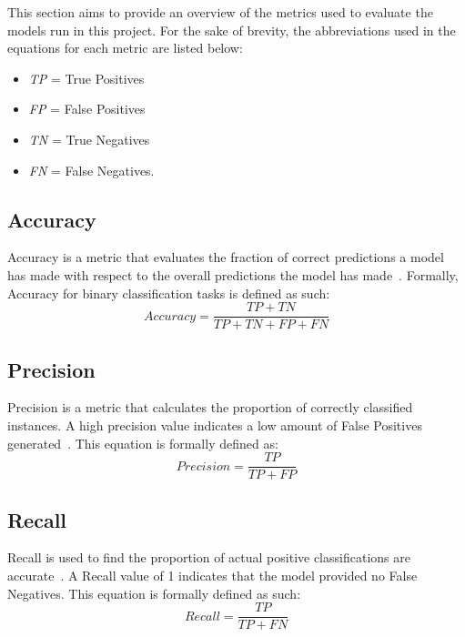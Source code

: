 \documentclass[11pt, a4paper]{article}
\begin{document}
This section aims to provide an overview of the metrics used to evaluate the models run in this project. For the sake of brevity, the abbreviations used in the equations for each metric are listed below:
\begin{itemize}
\item \emph{TP} = True Positives 
\item \emph{FP} = False Positives 
\item \emph{TN} = True Negatives 
\item \emph{FN} = False Negatives.
\end{itemize}

\subsection{Accuracy}

Accuracy is a metric that evaluates the fraction of correct predictions a model has made with respect to the overall predictions the model has made~\cite{accuracy}. Formally, Accuracy for binary classification tasks is defined as such:\\
\begin{equation}
Accuracy = \frac{TP + TN}{TP + TN + FP + FN}
\end{equation}

\subsection{Precision}

Precision is a metric that calculates the proportion of correctly classified instances. A high precision value indicates a low amount of False Positives generated~\cite{precision_recall}. This equation is formally defined as:\\
\begin{equation}
Precision = \frac{TP}{TP + FP}
\end{equation}

\subsection{Recall}

Recall is used to find the proportion of actual positive classifications are accurate~\cite{precision_recall}. A Recall value of 1 indicates that the model provided no False Negatives.  This equation is formally defined as such:\\
\begin{equation}
Recall = \frac{TP}{TP + FN}
\end{equation}
\end{document}
